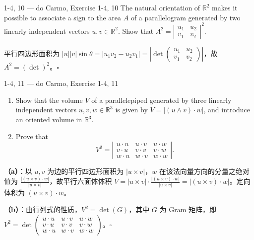 \begin{exercise}{1-4, 10 — do Carmo, Exercise 1-4, 10}
The natural orientation of $\mathbb{R}^2$ makes it possible to associate a sign to the area $A$ of a parallelogram generated by two linearly independent vectors $u, v \in \mathbb{R}^2$. Show that $A^2 = \left| \begin{smallmatrix} u_1 & u_2 \\ v_1 & v_2 \end{smallmatrix} \right|^2$.
\end{exercise}

\begin{solution}
平行四边形面积为 $|u||v|\sin\theta = |u_1v_2-u_2v_1| = \left|\det\begin{pmatrix}u_1&u_2\\v_1&v_2\end{pmatrix}\right|$，故 $A^2 = (\det)^2$。$\square$
\end{solution}

\begin{exercise}{1-4, 11 — do Carmo, Exercise 1-4, 11}
\begin{enumerate}
\item[a.] Show that the volume $V$ of a parallelepiped generated by three linearly independent vectors $u, v, w \in \mathbb{R}^3$ is given by $V = |(u \wedge v) \cdot w|$, and introduce an oriented volume in $\mathbb{R}^3$.
\item[b.] Prove that
\[
V^2 = \left| \begin{array}{ccc}
u \cdot u & u \cdot v & u \cdot w \\
v \cdot u & v \cdot v & v \cdot w \\
w \cdot u & w \cdot v & w \cdot w
\end{array} \right|.
\]
\end{enumerate}
\end{exercise}

\begin{solution}
\textbf{（a）}：以 $u,v$ 为边的平行四边形面积为 $|u\times v|$，$w$ 在该法向量方向的分量之绝对值为 $\frac{|(u\times v)\cdot w|}{|u\times v|}$，故平行六面体体积 $V = |u\times v| \cdot \frac{|(u\times v)\cdot w|}{|u\times v|} = |(u\times v)\cdot w|$。定向体积为 $(u\times v)\cdot w$。

\textbf{（b）}：由行列式的性质，$V^2 = \det(G)$，其中 $G$ 为 Gram 矩阵，即 $V^2 = \det\begin{pmatrix}u\cdot u&u\cdot v&u\cdot w\\ v\cdot u&v\cdot v&v\cdot w\\ w\cdot u&w\cdot v&w\cdot w\end{pmatrix}$。$\square$
\end{solution}

